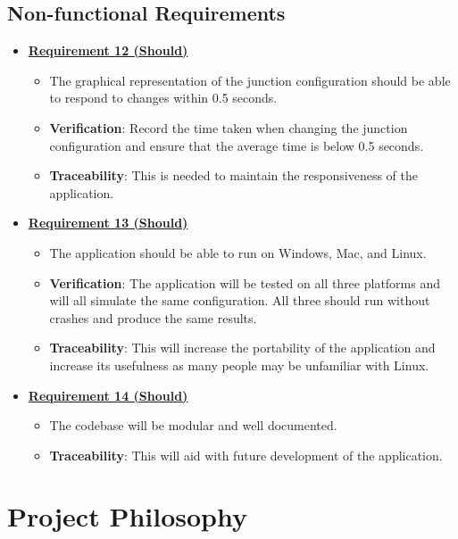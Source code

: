 \documentclass{article}
\begin{document}
\subsection{Non-functional Requirements}
\begin{itemize}
    \item \textbf{\underline{Requirement 12 (Should)}}
    \begin{itemize}
        \item The graphical representation of the junction configuration should be able to respond to changes within 
            0.5 seconds.
        \item \textbf{Verification}: Record the time taken when changing the junction configuration and ensure that 
            the average time is below 0.5 seconds.
        \item\textbf{Traceability}: This is needed to maintain the responsiveness of the application.
    \end{itemize}

    \item \textbf{\underline{Requirement 13 (Should)}}
    \begin{itemize}
        \item The application should be able to run on Windows, Mac, and Linux.
        \item \textbf{Verification}: The application will be tested on all three
             platforms and will all simulate the same configuration. All three should 
             run without crashes and produce the same results. 
        \item\textbf{Traceability}: This will increase the portability of the application 
            and increase its usefulness as many people may be unfamiliar with Linux.
    \end{itemize}

    \item \textbf{\underline{Requirement 14 (Should)}}
    \begin{itemize}
        \item The codebase will be modular and well documented.
        \item\textbf{Traceability}: This will aid with future development of the application.
    \end{itemize}
\end{itemize}

\section{Project Philosophy}
\end{document}
